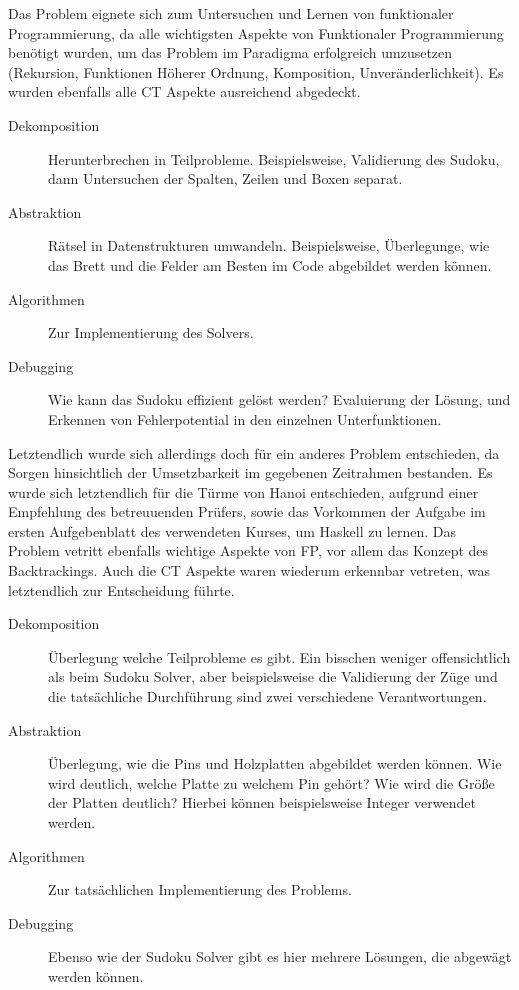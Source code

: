 Das Problem eignete sich zum Untersuchen und Lernen von funktionaler Programmierung, da alle wichtigsten Aspekte von Funktionaler Programmierung benötigt wurden, um das Problem im Paradigma erfolgreich umzusetzen (Rekursion, Funktionen Höherer Ordnung, Komposition, Unveränderlichkeit). Es wurden ebenfalls alle CT Aspekte ausreichend abgedeckt.

\begin{description}
    \item[Dekomposition] Herunterbrechen in Teilprobleme. Beispielsweise, Validierung des Sudoku, dann Untersuchen der Spalten, Zeilen und Boxen separat.
    \item[Abstraktion] Rätsel in Datenstrukturen umwandeln. Beispielsweise, Überlegunge, wie das Brett und die Felder am Besten im Code abgebildet werden können.
    \item[Algorithmen] Zur Implementierung des Solvers.
    \item[Debugging] Wie kann das Sudoku effizient gelöst werden? Evaluierung der Lösung, und Erkennen von Fehlerpotential in den einzelnen Unterfunktionen.
\end{description}

Letztendlich wurde sich allerdings doch für ein anderes Problem entschieden, da Sorgen hinsichtlich der Umsetzbarkeit im gegebenen Zeitrahmen bestanden.
Es wurde sich letztendlich für die Türme von Hanoi entschieden, aufgrund einer Empfehlung des betreuuenden Prüfers, sowie das Vorkommen der Aufgabe im ersten Aufgebenblatt des verwendeten Kurses, um Haskell zu lernen. %
Das Problem vetritt ebenfalls wichtige Aspekte von FP, vor allem das Konzept des Backtrackings. Auch die CT Aspekte waren wiederum erkennbar vetreten, was letztendlich zur Entscheidung führte.

\begin{description}
    \item[Dekomposition] Überlegung welche Teilprobleme es gibt. Ein bisschen weniger offensichtlich als beim Sudoku Solver, aber beispielsweise die Validierung der Züge und die tatsächliche Durchführung sind zwei verschiedene Verantwortungen.
    \item[Abstraktion] Überlegung, wie die Pins und Holzplatten abgebildet werden können. Wie wird deutlich, welche Platte zu welchem Pin gehört? Wie wird die Größe der Platten deutlich? Hierbei können beispielsweise Integer verwendet werden.
    \item[Algorithmen] Zur tatsächlichen Implementierung des Problems.
    \item[Debugging] Ebenso wie der Sudoku Solver gibt es hier mehrere Lösungen, die abgewägt werden können.
\end{description}


